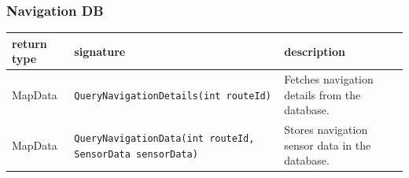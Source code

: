 \subsubsection{Navigation DB}
\begin{table}[H]
\centering
\small
\begin{tabularx}{\textwidth}{|L{3cm}|L{6.5cm}|Y|}
\hline
\textbf{return type} & \textbf{signature} & \textbf{description} \\
\hline
MapData & \texttt{QueryNavigationDetails(int routeId)} & Fetches navigation details from the database. \\
\hline
MapData & \texttt{QueryNavigationData(int routeId, SensorData sensorData)} & Stores navigation sensor data in the database. \\
\hline
\end{tabularx}
\end{table}
